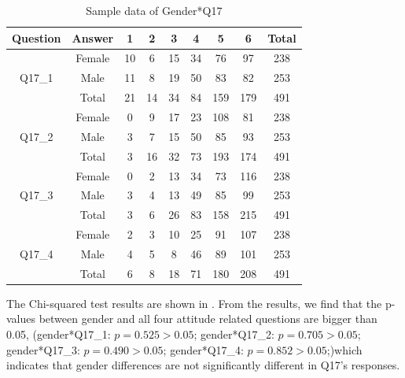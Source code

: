 \begin{table}[h]
  \caption{Sample data of Gender*Q17}
  \label{table30}
  \centering
\begin{tabular}{cc|ccccccc}
\hline
Question & Answer & 1  & 2  & 3  & 4  & 5   & 6   & Total \\
\hline
\multirow{3}{*}{Q17\_1}   & Female & 10 & 6  & 15 & 34 & 76  & 97  & 238                       \\
         & Male   & 11 & 8  & 19 & 50 & 83  & 82  & 253                       \\
         & Total  & 21 & 14 & 34 & 84 & 159 & 179 & 491                       \\
\hline
\multirow{3}{*}{Q17\_2}   & Female & 0  & 9  & 17 & 23 & 108 & 81  & 238                       \\
         & Male   & 3  & 7  & 15 & 50 & 85  & 93  & 253                       \\
         & Total  & 3  & 16 & 32 & 73 & 193 & 174 & 491                       \\
\hline
\multirow{3}{*}{Q17\_3}   & Female & 0  & 2  & 13 & 34 & 73  & 116 & 238                       \\
         & Male   & 3  & 4  & 13 & 49 & 85  & 99  & 253                       \\
         & Total  & 3  & 6  & 26 & 83 & 158 & 215 & 491                       \\
\hline
\multirow{3}{*}{Q17\_4}   & Female & 2  & 3  & 10 & 25 & 91  & 107 & 238                       \\
         & Male   & 4  & 5  & 8  & 46 & 89  & 101 & 253                       \\
         & Total  & 6  & 8  & 18 & 71 & 180 & 208 & 491                     \\
\hline         
\end{tabular}
\end{table}


The Chi-squared test results are shown in . From the results, we find that the p-values between gender and all four attitude related questions are bigger than 0.05, (gender*Q17\_1: $p=0.525>0.05$; gender*Q17\_2: $p=0.705>0.05$; gender*Q17\_3: $p=0.490>0.05$; gender*Q17\_4: $p=0.852>0.05$;)which indicates that gender differences are not significantly different in Q17's responses. 


